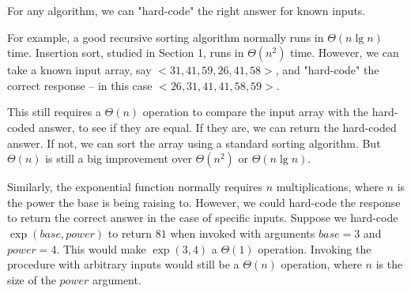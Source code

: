 \documentclass[a4paper,12pt]{article}
\begin{document}
\vspace{5mm}


For any algorithm, we can "hard-code" the right answer for known inputs. 

For example, a good recursive sorting algorithm normally runs in $\Theta(n \lg n)$ time. Insertion sort, 
studied in Section 1, runs in $\Theta(n^2)$ time. However, we can take a known input array, say 
$<31, 41, 59, 26, 41, 58>$, and "hard-code" the correct response -- in this case $<26, 31, 41, 41, 58, 59>$.

This still requires a $\Theta(n)$ operation to compare the input array with the hard-coded 
answer, to see if they are equal. If they are, we can return the hard-coded answer. If not, we can 
sort the array using a standard sorting algorithm. But $\Theta(n)$ is still a big improvement over $\Theta(n^2)$ or $\Theta(n \lg n)$. 

Similarly, the exponential function normally requires $n$ multiplications, where $n$ is the power the base 
is being raising to. However, we could hard-code the response to return the correct answer in the case of 
specific inputs. Suppose we hard-code $\exp(base, power)$ to return $81$ when invoked with arguments $base=3$ and $power=4$.
This would make $\exp(3,4)$ a $\Theta(1)$ operation. Invoking the procedure with arbitrary inputs
would still be a $\Theta(n)$ operation, where $n$ is the size of the $power$ argument.
\end{document}
